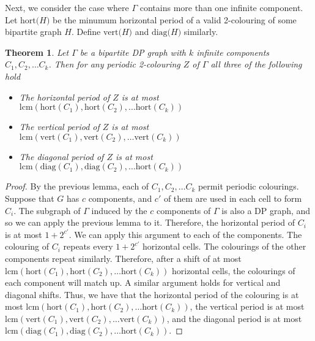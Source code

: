\documentclass[letterpaper]{article}
\newtheorem{theorem}{Theorem}[section]
\begin{document}
Next, we consider the case where $\Gamma$ contains more than one infinite component.
Let $\text{hort(} H \text{)}$ be the minumum horizontal period of a valid 2-colouring of some bipartite graph $H$.
Define $\text{vert(} H \text{)}$  and $\text{diag(} H \text{)}$ similarly.

\begin{theorem}
Let $\Gamma$ be a bipartite DP graph with $k$ infinite components $C_1, C_2, \ldots C_k$. Then for any periodic 2-colouring $Z$ of $\Gamma$ all three of the following hold

\begin{itemize}
    \item The horizontal period of $Z$ is at most $\text{lcm}(\text{hort}(C_1), \text{hort}(C_2), \ldots \text{hort}(C_k))$
    \item The vertical period of $Z$ is at most $\text{lcm}(\text{vert}(C_1), \text{vert}(C_2), \ldots \text{vert}(C_k))$
    \item The diagonal period of $Z$ is at most $\text{lcm}(\text{diag}(C_1), \text{diag}(C_2), \ldots \text{hort}(C_k))$
\end{itemize}
\end{theorem}

\begin{proof}
By the previous lemma, each of $C_1, C_2, \ldots C_k$ permit periodic colourings.
Suppose that $G$ has $c$ components, and $c'$ of them are used in each cell to form $C_i$.
The subgraph of $\Gamma$ induced by the $c$ components of $\Gamma$ is also a DP graph, and so we can apply the previous lemma to it.
Therefore, the horizontal period of $C_i$ is at most $1+2^{c'}$.
We can apply this argument to each of the components.
The colouring of $C_i$ repeats every $1+2^{c'}$ horizontal cells.
The colourings of the other components repeat similarly.
Therefore, after a shift of at most $\text{lcm}(\text{hort}(C_1), \text{hort}(C_2), \ldots \text{hort}(C_k))$ horizontal cells, the colourings of each component will match up.
A similar argument holds for vertical and diagonal shifts.
Thus, we have that the horizontal period of the colouring is at most $\text{lcm}(\text{hort}(C_1), \text{hort}(C_2), \ldots \text{hort}(C_k))$, the vertical period is at most $\text{lcm}(\text{vert}(C_1), \text{vert}(C_2), \ldots \text{vert}(C_k))$, and the diagonal period is at most $\text{lcm}(\text{diag}(C_1), \text{diag}(C_2), \ldots \text{hort}(C_k))$.
\end{proof}

\end{document}
